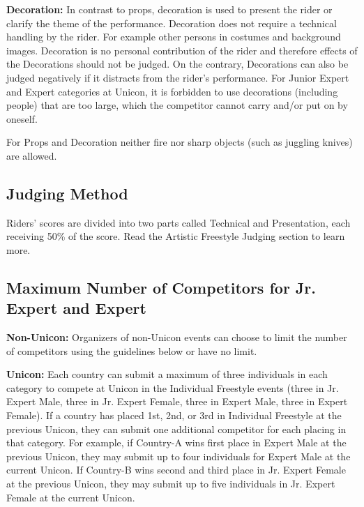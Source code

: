 \textbf{Decoration:} In contrast to props, decoration is used to present the rider or clarify the theme of the performance.
Decoration does not require a technical handling by the rider.
For example other persons in costumes and background images.
Decoration is no personal contribution of the rider and therefore effects of the Decorations should not be judged.
On the contrary, Decorations can also be judged negatively if it distracts from the rider's performance.
For Junior Expert and Expert categories at Unicon, it is forbidden to use decorations (including people) that are too large, which the competitor cannot carry and/or put on by oneself. 

For Props and Decoration neither fire nor sharp objects (such as juggling knives) are allowed.

\subsection{Judging Method}
Riders' scores are divided into two parts called Technical and Presentation, each receiving 50\% of the score.
Read the Artistic Freestyle Judging section to learn more.

\subsection{Maximum Number of Competitors for Jr. Expert and Expert}
\textbf{Non-Unicon:} Organizers of non-Unicon events can choose to limit the number of competitors using the guidelines below or have no limit.

\textbf{Unicon:} Each country can submit a maximum of three individuals in each category to compete at Unicon in the Individual Freestyle events (three in Jr. Expert Male, three in Jr. Expert Female, three in Expert Male, three in Expert Female).
If a country has placed 1st, 2nd, or 3rd in Individual Freestyle at the previous Unicon, they can submit one additional competitor for each placing in that category.
For example, if Country-A wins first place in Expert Male at the previous Unicon, they may submit up to four individuals for Expert Male at the current Unicon.
If Country-B wins second and third place in Jr. Expert Female at the previous Unicon, they may submit up to five individuals in Jr. Expert Female at the current Unicon.


